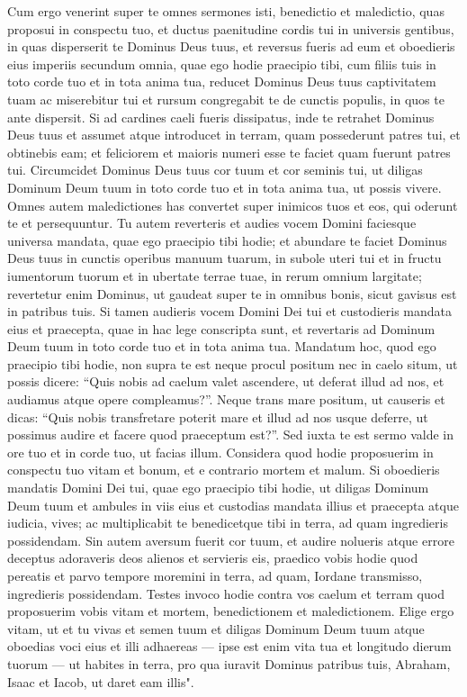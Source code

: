 \begin{biblechapter} 
\verse Cum ergo venerint super te omnes sermones isti, benedictio et maledictio, quas proposui in conspectu tuo, et ductus paenitudine cordis tui in universis gentibus, in quas disperserit te Dominus Deus tuus, 
\verse et reversus fueris ad eum et oboedieris eius imperiis secundum omnia, quae ego hodie praecipio tibi, cum filiis tuis in toto corde tuo et in tota anima tua, 
\verse reducet Dominus Deus tuus captivitatem tuam ac miserebitur tui et rursum congregabit te de cunctis populis, in quos te ante dispersit. 
\verse Si ad cardines caeli fueris dissipatus, inde te retrahet Dominus Deus tuus et assumet 
\verse atque introducet in terram, quam possederunt patres tui, et obtinebis eam; et feliciorem et maioris numeri esse te faciet quam fuerunt patres tui. 
\verse Circumcidet Dominus Deus tuus cor tuum et cor seminis tui, ut diligas Dominum Deum tuum in toto corde tuo et in tota anima tua, ut possis vivere. 
\verse Omnes autem maledictiones has convertet super inimicos tuos et eos, qui oderunt te et persequuntur. 
\verse Tu autem reverteris et audies vocem Domini faciesque universa mandata, quae ego praecipio tibi hodie; 
\verse et abundare te faciet Dominus Deus tuus in cunctis operibus manuum tuarum, in subole uteri tui et in fructu iumentorum tuorum et in ubertate terrae tuae, in rerum omnium largitate; revertetur enim Dominus, ut gaudeat super te in omnibus bonis, sicut gavisus est in patribus tuis. 
\verse Si tamen audieris vocem Domini Dei tui et custodieris mandata eius et praecepta, quae in hac lege conscripta sunt, et revertaris ad Dominum Deum tuum in toto corde tuo et in tota anima tua. 
\verse Mandatum hoc, quod ego praecipio tibi hodie, non supra te est neque procul positum 
\verse nec in caelo situm, ut possis dicere: “Quis nobis ad caelum valet ascendere, ut deferat illud ad nos, et audiamus atque opere compleamus?”. 
\verse Neque trans mare positum, ut causeris et dicas: “Quis nobis transfretare poterit mare et illud ad nos usque deferre, ut possimus audire et facere quod praeceptum est?”. 
\verse Sed iuxta te est sermo valde in ore tuo et in corde tuo, ut facias illum. 
\verse Considera quod hodie proposuerim in conspectu tuo vitam et bonum, et e contrario mortem et malum. 
\verse Si oboedieris mandatis Domini Dei tui, quae ego praecipio tibi hodie, ut diligas Dominum Deum tuum et ambules in viis eius et custodias mandata illius et praecepta atque iudicia, vives; ac multiplicabit te benedicetque tibi in terra, ad quam ingredieris possidendam. 
\verse Sin autem aversum fuerit cor tuum, et audire nolueris atque errore deceptus adoraveris deos alienos et servieris eis, 
\verse praedico vobis hodie quod pereatis et parvo tempore moremini in terra, ad quam, Iordane transmisso, ingredieris possidendam. 
\verse Testes invoco hodie contra vos caelum et terram quod proposuerim vobis vitam et mortem, benedictionem et maledictionem. Elige ergo vitam, ut et tu vivas et semen tuum 
\verse et diligas Dominum Deum tuum atque oboedias voci eius et illi adhaereas — ipse est enim vita tua et longitudo dierum tuorum — ut habites in terra, pro qua iuravit Dominus patribus tuis, Abraham, Isaac et Iacob, ut daret eam illis". 
\end{biblechapter}

